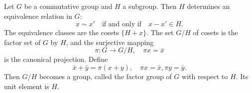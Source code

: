 Let $G$ be a commutative group and $H$ a subgroup. Then $H$ determines an equivalence relation in $G$:
$$x \sim x' \quad \text{if and only if} \quad x - x' \in H.$$
The equivalence classes are the cosets $\{H + x\}$. The set $G/H$ of cosets is the factor set of $G$ by $H$, and the surjective mapping
$$\pi: G \to G/H, \quad \pi x = \bar{x}$$
is the canonical projection. Define
$$\bar{x} + \bar{y} = \pi(x + y), \quad \pi x = \bar{x}, \pi y = \bar{y}.$$
Then $G/H$ becomes a group, called the factor group of $G$ with respect to $H$. Its unit element is $H$.
